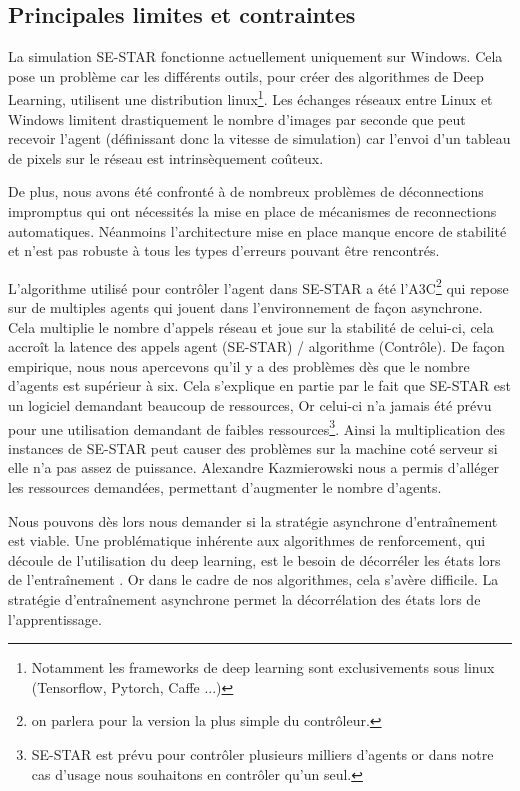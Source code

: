 \subsection{Principales limites et contraintes}

La simulation SE-STAR fonctionne actuellement uniquement sur Windows. Cela pose un problème car les différents outils, pour créer des algorithmes de Deep Learning, utilisent une distribution linux\footnote{Notamment les frameworks de deep learning sont exclusivements sous linux (Tensorflow, Pytorch, Caffe ...)}. Les échanges réseaux entre Linux et Windows limitent drastiquement le nombre d'images par seconde que peut recevoir l'agent (définissant donc la vitesse de simulation) car l'envoi d'un tableau de pixels sur le réseau est intrinsèquement coûteux. 

De plus, nous avons été confronté à de nombreux problèmes de déconnections impromptus qui ont nécessités la mise en place de mécanismes de reconnections automatiques. Néanmoins l'architecture mise en place manque encore de stabilité et n'est pas robuste à tous les types d'erreurs pouvant être rencontrés.

L'algorithme utilisé pour contrôler l'agent dans SE-STAR a été l'\gls{A3C}\footnote{on parlera pour la version la plus simple du contrôleur.} qui repose sur de multiples agents qui jouent dans l'environnement de façon asynchrone. Cela multiplie le nombre d'appels réseau et joue sur la stabilité de celui-ci, cela accroît la latence des appels agent (SE-STAR) / algorithme (Contrôle). De façon empirique, nous nous apercevons qu'il y a des problèmes dès que le nombre d'agents est supérieur à six. Cela s'explique en partie par le fait que SE-STAR est un logiciel demandant beaucoup de ressources, Or celui-ci n'a jamais été prévu pour une utilisation demandant de faibles ressources\footnote{SE-STAR est prévu pour contrôler plusieurs milliers d'agents or dans notre cas d'usage nous souhaitons en contrôler qu'un seul.}. Ainsi la multiplication des instances de SE-STAR peut causer des problèmes sur la machine coté serveur si elle n'a pas assez de puissance. Alexandre  Kazmierowski nous a permis d'alléger les ressources demandées, permettant d'augmenter le nombre d'agents.

Nous pouvons dès lors nous demander si la stratégie asynchrone d'entraînement est viable.
Une problématique inhérente aux algorithmes de renforcement, qui découle de l'utilisation du deep learning, est le besoin de décorréler les états lors de l'entraînement . Or dans le cadre de nos algorithmes, cela s'avère difficile. La stratégie d'entraînement asynchrone permet la décorrélation des états lors de l'apprentissage.


